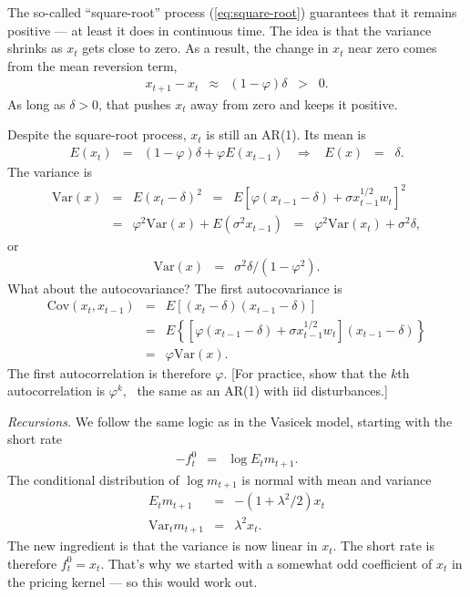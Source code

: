 \documentclass[11pt]{article}
\begin{document}
The so-called ``square-root'' process (\ref{eq:square-root}) guarantees that
it remains positive --- at least it does in continuous time.
The idea is that the variance shrinks as $x_t$ gets close to zero.
As a result, the change in $x_t$ near zero comes from the mean reversion term,
\begin{eqnarray*}
       x_{t+1} - x_t  &\approx& (1-\varphi) \delta  \;\;>\;\; 0.
\end{eqnarray*}
As long as $\delta>0$, that pushes $x_t$ away from zero and keeps it positive.


Despite the square-root process, $x_t$ is still an AR(1).
Its mean is
\begin{eqnarray*}
    E(x_t) &=& (1-\varphi) \delta + \varphi E(x_{t-1})
            \;\;\;\Rightarrow\;\;\; E(x) \;\;=\;\; \delta .
\end{eqnarray*}
The variance is
\begin{eqnarray*}
    \mbox{Var}(x) &=& E (x_t - \delta)^2
                \;\;=\;\; E \left[ \varphi (x_{t-1} - \delta) + \sigma x_{t-1}^{1/2} w_t \right]^2 \\
                &=& \varphi^2 \mbox{Var}(x) + E (\sigma^2 x_{t-1})
                \;\;=\;\;  \varphi^2 \mbox{Var}(x_{t}) + \sigma^2 \delta ,
\end{eqnarray*}
or
\begin{eqnarray*}
    \mbox{Var}(x) &=&   \sigma^2 \delta / (1-\varphi^2) .
\end{eqnarray*}
What about the autocovariance?
The first autocovariance is
\begin{eqnarray*}
    \mbox{Cov}(x_t,x_{t-1}) &=& E [(x_t - \delta)(x_{t-1} - \delta)]  \\
                &=& E  \left\{ [ \varphi (x_{t-1} - \delta) + \sigma x_{t-1}^{1/2} w_t ] (x_{t-1} - \delta) \right\} \\
                &=& \varphi \mbox{Var}(x) .
\end{eqnarray*}
The first autocorrelation is therefore $\varphi$.
[For practice, show that the $k$th autocorrelation is $\varphi^k$, \
the same as an AR(1) with iid disturbances.]

{\it Recursions.\/}
We follow the same logic as in the Vasicek model,
starting with the short rate
\begin{eqnarray*}
    - f^0_t &=&   \log E_t m_{t+1} .
\end{eqnarray*}
The conditional distribution of $\log m_{t+1}$ is
normal with mean and variance
\begin{eqnarray*}
    E_t m_{t+1} &=& - (1+\lambda^2/2) x_t \\
    \mbox{Var}_t m_{t+1} &=& \lambda^2 x_t .
\end{eqnarray*}
The new ingredient is that the variance is now linear in $x_t$.
The short rate is therefore
$ f^0_t = x_t $.
That's why we started with a somewhat odd coefficient of $x_t$
in the pricing kernel --- so this would work out.
\end{document}

